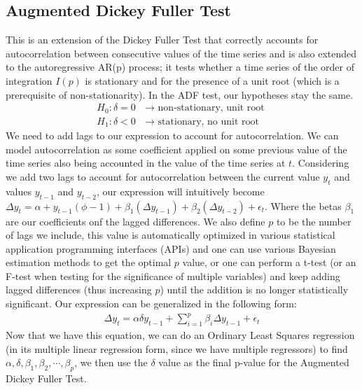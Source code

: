 \documentclass{article}
\begin{document}
\begin{spacing}{2.0}
\subsection{Augmented Dickey Fuller Test}

This is an extension of the Dickey Fuller Test that correctly accounts for autocorrelation between consecutive values of the time series and is also extended to the autoregressive
AR(p) process; it tests whether a time series of the order of integration $I(p)$ is stationary and for the presence of a unit root (which is a prerequisite of non-stationarity).
In the ADF test, our hypotheses stay the same.
\begin{gather*}
    H_{0} : \delta = 0 \text{ $\rightarrow$ non-stationary, unit root} \\
    H_{1} : \delta < 0 \text{ $\rightarrow$ stationary, no unit root}
\end{gather*}
We need to add lags to our expression to account for autocorrelation. We can model autocorrelation as some coefficient applied on some previous value of the time series also being
accounted in the value of the time series at $t$. Considering we add two lags to account for autocorrelation between the current value $y_{t}$ and values $y_{t - 1}$ and $y_{t - 2}$,
our expression will intuitively become $\Delta y_{t} = \alpha + y_{t - 1} (\phi - 1) + \beta_{1}(\Delta y_{t - 1}) + \beta_{2}(\Delta y_{t - 2}) + \epsilon_{t}$. Where the betas $\beta_{1}$
are our coefficients onf the lagged differences. We also define $p$ to be the number of lags we include, this value is automatically optimized in various statistical application
programming interfaces (APIs) and one can use various Bayesian estimation methods to get the optimal $p$ value, or one can perform a t-test (or an F-test when testing for the significance
of multiple variables) and keep adding lagged differences (thus increasing $p$) until the addition is no longer statistically significant. Our expression can be generalized in the
following form:
\begin{gather*}
    \Delta y_{t} = \alpha \delta y_{t - 1} + \sum_{i = 1}^{p} \beta_{i} \Delta y_{t - 1} + \epsilon_{t}
\end{gather*}
Now that we have this equation, we can do an Ordinary Least Squares regression (in its multiple linear regression form, since we have multiple regressors) to find
$\alpha, \delta, \beta_{1}, \beta_{2}, \cdots, \beta_{p}$, we then use the $\delta$ value as the final p-value for the Augmented Dickey Fuller Test.


\end{spacing}
\end{document}
